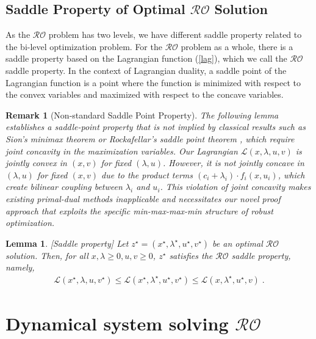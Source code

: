 \documentclass[journal,twoside,web]{ieeecolor}
\newcommand{\rev}[1]{\textcolor{revisionblue}{#1}}
\newtheorem{lemma}{Lemma}
\newtheorem{remark}{Remark}
\begin{document}
\subsection*{\rev{Saddle Property of Optimal $\mathcal{RO}$ Solution}}

As the $\mathcal{RO}$ problem has two levels, we have different saddle property related to the bi-level optimization problem. For the $\mathcal{RO}$ problem as a whole, there is a saddle property based on the Lagrangian function (\ref{lag}), which we call the $\mathcal{RO}$ saddle property. In the context of Lagrangian duality, a saddle point of the Lagrangian function is a point where the function is minimized with respect to the convex variables and maximized with respect to the concave variables.

\begin{remark}[\rev{Non-standard Saddle Point Property}]
\rev{The following lemma establishes a saddle-point property that is not implied by classical results such as Sion's minimax theorem \cite{sion1958} or Rockafellar's saddle point theorem \cite{rockafellar1970}, which require joint concavity in the maximization variables. Our Lagrangian $\mathcal{L}(x,\lambda,u,v)$ is jointly convex in $(x,v)$ for fixed $(\lambda,u)$. However, it is not jointly concave in $(\lambda,u)$ for fixed $(x,v)$ due to the product terms $(c_i+\lambda_i) \cdot f_i(x,u_i)$, which create bilinear coupling between $\lambda_i$ and $u_i$. This violation of joint concavity makes existing primal-dual methods \cite{arrow1958,feijer2010} inapplicable and necessitates our novel proof approach that exploits the specific min-max-max-min structure of robust optimization.}
\end{remark}

\begin{lemma} \label{saddle.lem} [Saddle property]
Let $z^\star=(x^\star,\lambda^\star,u^\star,v^\star)$ be an optimal $\mathcal{RO}$ solution. Then, for all $x,\lambda\geq 0,u,v\geq 0$\;, $z^\star$ satisfies the $\mathcal{RO}$ saddle property, namely,
\begin{align} \label{saddle}
\mathcal{L}(x^\star,\lambda,u,v^\star)\leq \mathcal{L}(x^\star,\lambda^\star,u^\star,v^\star)\leq \mathcal{L}(x,\lambda^\star,u^\star,v)\;.
\end{align}
\end{lemma}

\section{Dynamical system solving $\mathcal{RO}$} \label{section_pddynamics}
\end{document}
